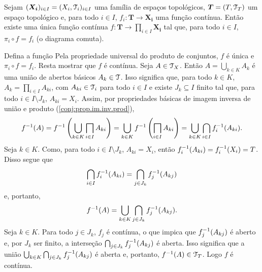 \begin{prop}
Sejam $(\bm{X_i})_{i \in I} = (X_i,\mathcal{T}_i)_{i \in I}$ uma família de espaços topológicos, $\bm T = (T,\mathcal{T}_T)$ um espaço topológico e, para todo $i \in I$, $f_i: \bm T \to \bm{X_i}$ uma função contínua. Então existe uma única função contínua $f: \bm T \to \prod_{i \in I} \bm{X_i}$ tal que, para todo $i \in I$, $\pi_i \circ f = f_i$ (o diagrama comuta).
\begin{figure}
\centering
{}
\end{figure}
\end{prop}
\begin{defi}
Defina a função 
Pela propriedade universal do produto de conjuntos, $f$ é única e $\pi_i \circ f = f_i$. Resta mostrar que $f$ é contínua. Seja $A \in \mathcal{T}_X$. Então $A=\bigcup_{k \in K} A_k$ é uma união de abertos básicos $A_k \in \mathcal{T}$. Isso significa que, para todo $k \in K$, $A_k = \prod_{i \in I} A_{ki}$, com $A_{ki} \in \mathcal{T}_i$ para todo $i \in I$ e existe $J_k \subseteq I$ finito tal que, para todo $i \in I \setminus J_k$, $A_{ki} = X_i$. Assim, por propriedades básicas de imagem inversa de união e produto (\ref{conj:prop.im.inv.prod}),
		\begin{equation*}
		f\inv(A) = f\inv\left(\bigcup_{k \in K}\prod_{i \in I} A_{ki}\right) = \bigcup_{k \in K} f\inv \left( \prod_{i \in I} A_{ki} \right) = \bigcup_{k \in K}\bigcap_{i \in I}f_i\inv(A_{ki}).
		\end{equation*}
Seja $k \in K$. Como, para todo $i \in I \setminus J_k$, $A_{ki} = X_i$, então $f_i^{-1}(A_{ki}) = f_i^{-1}(X_i) = T$. Disso segue que
	\begin{equation*}
	\bigcap_{i \in I}f_i^{-1}(A_{ki}) = \bigcap_{j \in J_k}f_j^{-1}(A_{kj})
	\end{equation*}
e, portanto,
	\begin{equation*}
	f^{-1}(A) = \bigcup_{k \in K}\bigcap_{j \in J_k}f_j^{-1}(A_{kj}).
	\end{equation*}
Seja $k \in K$. Para todo $j \in J_k$, $f_j$ é contínua, o que impica que $f_j^{-1}(A_{kj})$ é aberto e, por $J_k$ ser finito, a interseção $\bigcap_{j \in J_k}f_j^{-1}(A_{kj})$ é aberta. Isso significa que a união $\bigcup_{k \in K}\bigcap_{j \in J_k}f_j^{-1}(A_{kj})$ é aberta e, portanto, $f^{-1}(A) \in \mathcal{T}_T$. Logo $f$ é contínua.
\end{defi}












